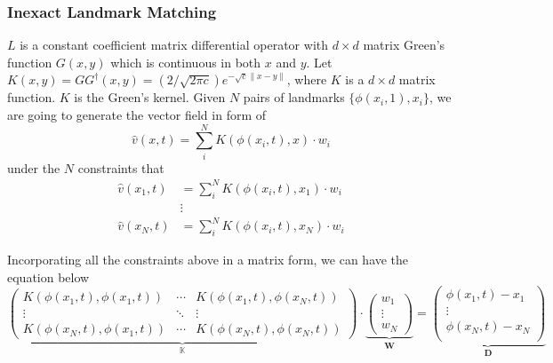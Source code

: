 \documentclass{article}
\theoremstyle{definition}
\theoremstyle{plain}
\begin{document}
\subsubsection{Inexact Landmark Matching}
$L$ is a constant coefficient matrix differential operator with $d\times d$ matrix Green's function $G(x,y)$ which is continuous in both $x$ and $y$. Let $K(x,y)=GG^\dagger(x,y)=(2/\sqrt{2\pi c})e^{-\sqrt{c}\|x-y\|}$, where $K$ is a $d\times d$ matrix function. $K$ is the Green's kernel\cite{ref2}. 
Given $N$ pairs of landmarks $\{\phi(x_i,1),x_i\}$, we are going to generate the vector field in form of
\begin{equation*}
    \hat{v}(x,t)=\sum^N_iK(\phi(x_i,t),x)\cdot w_i
\end{equation*}
under the $N$ constraints that
\begin{align*}
    \hat{v}(x_1,t)&=\sum^N_iK(\phi(x_i,t),x_1)\cdot w_i\\
    &\vdots\\
    \hat{v}(x_N,t)&=\sum^N_iK(\phi(x_i,t),x_N)\cdot w_i
\end{align*}

Incorporating all the constraints above in a matrix form, we can have the equation below
\begin{equation*}
    \underbrace{
    \begin{pmatrix}
    K(\phi(x_1,t),\phi(x_1,t))&\cdots&K(\phi(x_1,t),\phi(x_N,t))\\
    \vdots&\ddots&\vdots\\
    K(\phi(x_N,t),\phi(x_1,t))&\cdots&K(\phi(x_N,t),\phi(x_N,t))
    \end{pmatrix}}_{\mathbb{K}}
    \cdot
    \underbrace{
    \begin{pmatrix}
    w_1\\
    \vdots\\
    w_N
    \end{pmatrix}}_{\mathbf{W}}
    =
    \underbrace{
    \begin{pmatrix}
    \phi(x_1,t)-x_1\\
    \vdots\\
    \phi(x_N,t)-x_N\\
    \end{pmatrix}}_{\mathbf{D}}
\end{equation*}
\end{document}
